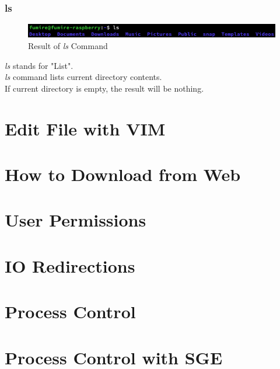 \documentclass{beamer}
\begin{document}
	\begin{frame}
		\frametitle{ls}
		\begin{figure}[h!]
			\centering
			\includegraphics[width=0.5 \linewidth]{figures/3.png}
			\caption{Result of \textit{ls} Command}
		\end{figure}
	
		\textit{ls} stands for "List". \\
		\textit{ls} command lists current directory contents. \\
		If current directory is empty, the result will be nothing. 
	\end{frame}
	
	\section{Edit File with VIM}
	
	\section{How to Download from Web}
	
	\section{User Permissions}
	
	\section{IO Redirections}
	
	\section{Process Control}
	
	\section{Process Control with SGE}
\end{document}
